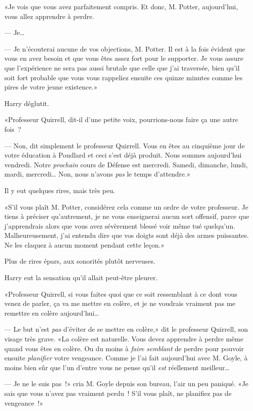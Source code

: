 «Je vois que vous avez parfaitement compris. Et donc, M. Potter, aujourd'hui, vous allez apprendre à perdre.

--- Je…

--- Je n'écouterai aucune de vos objections, M. Potter. Il est à la fois évident que vous en avez besoin et que vous êtes assez fort pour le supporter. Je vous assure que l'expérience ne sera pas aussi brutale que celle que j'ai traversée, bien qu'il soit fort probable que vous vous rappeliez ensuite ces quinze minutes comme les pires de votre jeune existence.»

Harry déglutit.

«Professeur Quirrell, dit-il d'une petite voix, pourrions-nous faire ça une autre fois~?

--- Non, dit simplement le professeur Quirrell. Vous en êtes au cinquième jour de votre éducation à Poudlard et ceci s'est déjà produit. Nous sommes aujourd'hui vendredi. Notre \emph{prochain} cours de Défense est mercredi. Samedi, dimanche, lundi, mardi, mercredi… Non, nous n'avons \emph{pas} le temps d'attendre.»

Il y eut quelques rires, mais très peu.

«S'il vous plaît M. Potter, considérez cela comme un ordre de votre professeur. Je tiens à préciser qu'autrement, je ne vous enseignerai aucun sort offensif, parce que j'apprendrais alors que vous avez sévèrement blessé voir même tué quelqu'un. Malheureusement, j'ai entendu dire que vos doigts sont déjà des armes puissantes. Ne les claquez à aucun moment pendant cette leçon.»

Plus de rires épars, aux sonorités plutôt nerveuses.

Harry eut la sensation qu'il allait peut-être pleurer.

«Professeur Quirrell, si vous faites quoi que ce soit ressemblant à ce dont vous venez de parler, ça va me mettre en colère, et je ne voudrais vraiment pas me remettre en colère aujourd'hui…

--- Le but n'est \emph{pas} d'éviter de se mettre en colère,» dit le professeur Quirrell, son visage très grave. «La colère est naturelle. Vous devez apprendre à perdre même quand vous êtes en colère. Ou du moins à \emph{faire semblant} de perdre pour pouvoir ensuite \emph{planifier} votre vengeance. Comme je l'ai fait aujourd'hui avec M. Goyle, à moins bien sûr que l'un d'entre vous ne pense qu'il \emph{est} réellement meilleur…

--- Je ne le suis pas~!» cria M. Goyle depuis son bureau, l'air un peu paniqué. «Je sais que vous n'avez pas vraiment perdu~! S'il vous plaît, ne planifiez pas de vengeance~!»

